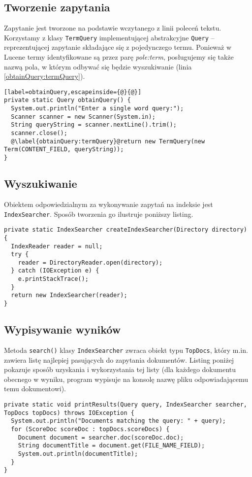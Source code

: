 \subsection{Tworzenie zapytania}

Zapytanie jest tworzone na podstawie wczytanego z linii poleceń tekstu. Korzystamy z klasy \texttt{TermQuery} implementującej abstrakcyjne \texttt{Query} -- reprezentującej zapytanie składające się z pojedynczego termu. Ponieważ w Lucene termy identyfikowane są przez parę \emph{pole:term}, posługujemy się także nazwą pola, w którym odbywać się będzie wyszukiwanie (linia \ref{obtainQuery:termQuery}).

\begin{lstlisting}[label=obtainQuery,escapeinside={@}{@}]
private static Query obtainQuery() {
  System.out.println("Enter a single word query:");
  Scanner scanner = new Scanner(System.in);
  String queryString = scanner.nextLine().trim();
  scanner.close();
  @\label{obtainQuery:termQuery}@return new TermQuery(new Term(CONTENT_FIELD, queryString));
}
\end{lstlisting}

\subsection{Wyszukiwanie}

Obiektem odpowiedzialnym za wykonywanie zapytań na indeksie jest \\ \texttt{IndexSearcher}. Sposób tworzenia go ilustruje poniższy listing.

\begin{lstlisting}
private static IndexSearcher createIndexSearcher(Directory directory) {
  IndexReader reader = null;
  try {
    reader = DirectoryReader.open(directory);
  } catch (IOException e) {
    e.printStackTrace();
  }
  return new IndexSearcher(reader);
}
\end{lstlisting}

\subsection{Wypisywanie wyników}

Metoda \texttt{search()} klasy \texttt{IndexSearcher} zwraca obiekt typu \texttt{TopDocs}, który m.in. zawiera listę najlepiej pasujących do zapytania dokumentów. Listing poniżej pokazuje sposób uzyskania i wykorzystania tej listy (dla każdego dokumentu obecnego w wyniku, program wypisuje na konsolę nazwę pliku odpowiadającemu temu dokumentowi).

\begin{lstlisting}
private static void printResults(Query query, IndexSearcher searcher, TopDocs topDocs) throws IOException {
  System.out.println("Documents matching the query: " + query);
  for (ScoreDoc scoreDoc : topDocs.scoreDocs) {
    Document document = searcher.doc(scoreDoc.doc);
    String documentTitle = document.get(FILE_NAME_FIELD);
    System.out.println(documentTitle);
  }
}
\end{lstlisting}

